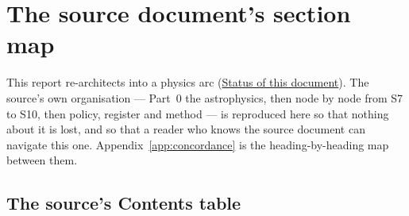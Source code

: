 
\section{The source document's section map}
\label{app:sectionmap}

This report re-architects  into a physics arc
(\hyperref[sec:status]{Status of this document}). The source's own organisation --- Part~0 the astrophysics,
then node by node from S7 to S10, then policy, register and method --- is
reproduced here so that nothing about it is lost, and so that a reader who knows
the source document can navigate this one.
Appendix~\ref{app:concordance} is the heading-by-heading map between them.

\subsection{The source's Contents table}
\label{app:sourcecontents}

